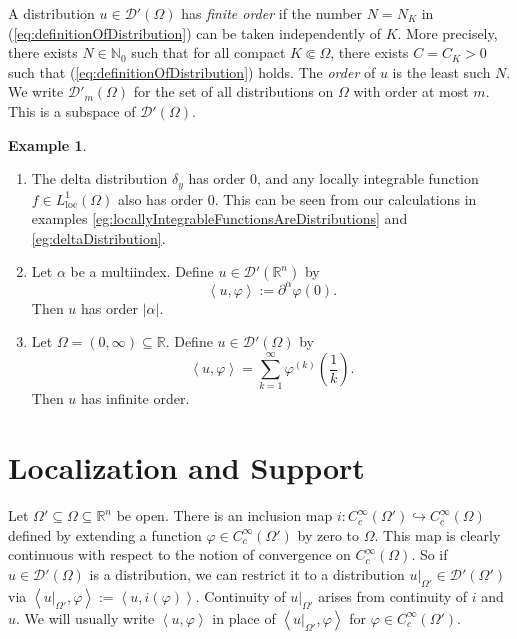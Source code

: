 \documentclass{book}
\newcommand{\scrD}{\mathscr{D}}
\newcommand{\bbN}{\mathbb{N}}
\newcommand{\bbR}{\mathbb{R}}
\renewcommand{\phi}{\varphi}
\newcommand{\abs}[1]{\left\lvert {#1} \right\rvert}
\newcommand{\angles}[1]{\left\langle {#1} \right\rangle}
\theoremstyle{definition}
\newtheorem{example}[theorem]{Example}
\theoremstyle{remark}
\numberwithin{equation}{chapter}
\begin{document}
A distribution $u \in \scrD'(\Omega)$ has \textit{finite order} if the number $N = N_K$ in (\ref{eq:definitionOfDistribution}) can be taken independently of $K$. More precisely, there exists $N \in \bbN_0$ such that for all compact $K \Subset \Omega$, there exists $C = C_K > 0$ such that (\ref{eq:definitionOfDistribution}) holds. The \textit{order} of $u$ is the least such $N$. We write $\scrD'_m(\Omega)$ for the set of all distributions on $\Omega$ with order at most $m$. This is a subspace of $\scrD'(\Omega)$.
\begin{example}
    \begin{enumerate}[label=(\arabic*)]
        \item The delta distribution $\delta_y$ has order $0$, and any locally integrable function $f \in L_\text{loc}^1(\Omega)$ also has order $0$. This can be seen from our calculations in examples \ref{eg:locallyIntegrableFunctionsAreDistributions} and \ref{eg:deltaDistribution}.

        \item Let $\alpha$ be a multiindex. Define $u \in \scrD'(\bbR^n)$ by 
        \begin{equation}
            \angles{u,\phi} := \partial^\alpha \phi(0).
        \end{equation}
        Then $u$ has order $\abs{\alpha}$.

        \item Let $\Omega = (0,\infty) \subseteq \bbR$. Define $u \in \scrD'(\Omega)$ by 
        \begin{equation}
            \angles{u,\phi} = \sum_{k=1}^\infty \phi^{(k)}\left(\frac{1}{k}\right).
        \end{equation}
        Then $u$ has infinite order.
    \end{enumerate}
\end{example}

\section{Localization and Support}
Let $\Omega' \subseteq \Omega \subseteq \bbR^n$ be open. There is an inclusion map $i \colon C_c^\infty(\Omega') \hookrightarrow C_c^\infty(\Omega)$ defined by extending a function $\phi \in C_c^\infty(\Omega')$ by zero to $\Omega$. This map is clearly continuous with respect to the notion of convergence on $C_c^\infty(\Omega)$. So if $u \in \scrD'(\Omega)$ is a distribution, we can restrict it to a distribution $u\vert_{\Omega'} \in \scrD'(\Omega')$ via $\angles{ u\vert_{\Omega'}, \phi} := \angles{ u, i(\phi) }$. Continuity of $u\vert_{\Omega'}$ arises from continuity of $i$ and $u$. We will usually write $\angles{u,\phi}$ in place of $\angles{ u\vert_{\Omega'},\phi }$ for $\phi \in C_c^\infty(\Omega')$.
\end{document}
